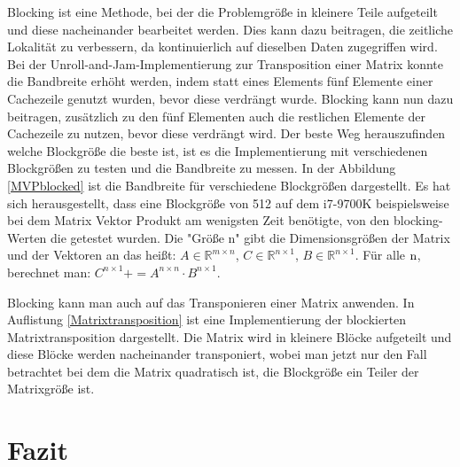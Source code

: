 \documentclass[sigconf,language=ngerman]{acmart}
\begin{document}
Blocking ist eine Methode, 
bei der die Problemgröße in kleinere Teile aufgeteilt und diese nacheinander bearbeitet werden. 
Dies kann dazu beitragen, die zeitliche Lokalität zu verbessern, 
da kontinuierlich auf dieselben Daten zugegriffen wird. 
Bei der Unroll-and-Jam-Implementierung zur Transposition einer Matrix konnte die Bandbreite erhöht werden, 
indem statt eines Elements fünf Elemente einer Cachezeile genutzt wurden, 
bevor diese verdrängt wurde. Blocking kann nun dazu beitragen, 
zusätzlich zu den fünf Elementen auch die restlichen Elemente der Cachezeile zu nutzen, 
bevor diese verdrängt wird. Der beste Weg herauszufinden welche Blockgröße die beste ist,
ist es die Implementierung mit verschiedenen Blockgrößen zu testen und die Bandbreite zu messen.
In der Abbildung \ref{MVPblocked} ist die Bandbreite für verschiedene Blockgrößen dargestellt.
Es hat sich herausgestellt, dass eine Blockgröße von 512 auf dem i7-9700K beispielsweise bei dem Matrix Vektor Produkt am wenigsten Zeit benötigte,
von den blocking-Werten die getestet wurden. Die "Größe n" gibt die Dimensionsgrößen der Matrix und der Vektoren an das heißt:
$A \in \mathbb{R}^{m \times n}$, $C \in \mathbb{R}^{n \times 1}$, $B \in \mathbb{R}^{n \times 1}$. Für alle $\textnormal{n}$, berechnet man:
$C^{n\times 1} += A^{n \times n} \cdot B^{n \times 1}$.


Blocking kann man auch auf das Transponieren einer Matrix anwenden. 
In Auflistung \ref{Matrixtransposition} ist eine Implementierung der blockierten Matrixtransposition dargestellt.
Die Matrix wird in kleinere Blöcke aufgeteilt und diese Blöcke werden nacheinander transponiert, wobei man jetzt
nur den Fall betrachtet bei dem die Matrix quadratisch ist, 
die Blockgröße ein Teiler der Matrixgröße ist.






\section{Fazit}


















\appendix
\end{document}
